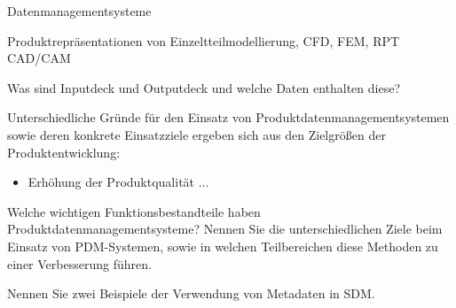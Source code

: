 \documentclass[
	ngerman,
	color = black,
	]{tudaexercise}
\begin{document}
\begin{task}[credit=15{,}5 P]{Datenmanagementsysteme}
	\begin{subtask}[credit=5 P]
		 Produktrepräsentationen von Einzeltteilmodellierung, CFD, FEM, RPT CAD/CAM
	\end{subtask}
	
	\begin{subtask}[credit=2 P]
		
	\end{subtask}
	
	\begin{subtask}[credit=2{,}5 P]
		Was sind Inputdeck und Outputdeck und welche Daten enthalten diese?
	\end{subtask}
	
	Unterschiedliche Gründe für den Einsatz von Produktdatenmanagementsystemen sowie deren konkrete Einsatzziele ergeben sich aus den Zielgrößen der Produktentwicklung:
	\begin{itemize}
		\item Erhöhung der Produktqualität
		...
	\end{itemize} %
	
	\begin{subtask}[credit=4 P]
		Welche wichtigen Funktionsbestandteile haben Produktdatenmanagementsysteme?
		Nennen Sie die unterschiedlichen Ziele beim Einsatz von PDM-Systemen, sowie in welchen Teilbereichen diese Methoden zu einer Verbesserung führen.
	\end{subtask}
	
	\begin{subtask}[credit=2 P]
		Nennen Sie zwei Beispiele der Verwendung von Metadaten in SDM.
	\end{subtask}
\end{task}
\end{document}
